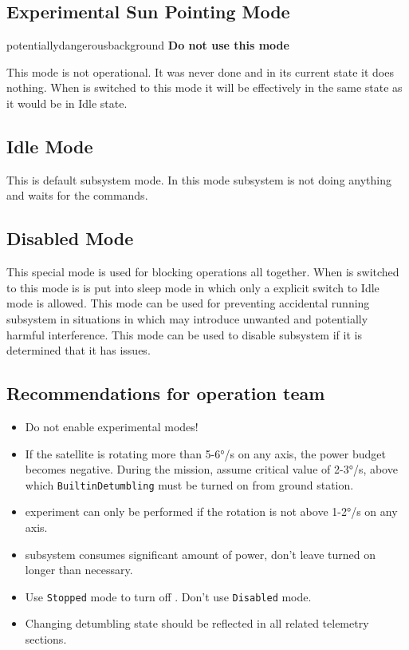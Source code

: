 \subsection{Experimental Sun Pointing Mode}

\begin{coloriconbox}{\faWarning}{potentiallydangerousbackground}
    \textbf{Do not use this mode}
\end{coloriconbox}

This mode is not operational. It was never done and in its current state it does nothing. 
When \Adcs is switched to this mode it will be effectively in the same state as it would 
be in Idle state.  

\subsection{Idle Mode}

This is default \Adcs subsystem mode. In this mode \Adcs subsystem is not 
doing anything and waits for the commands. 

\subsection{Disabled Mode}

This special mode is used for blocking \Adcs operations all together. When 
\Adcs is switched to this mode is is put into sleep mode in which only a
explicit switch to Idle mode is allowed. This mode can be used for preventing
accidental running \Adcs subsystem in situations in which \Adcs may introduce 
unwanted and potentially harmful interference. This mode can be used to disable 
\Adcs subsystem if it is determined that it has issues. 

\subsection{Recommendations for operation team}
\begin{itemize}
    \item Do not enable experimental modes!
    \item If the satellite is rotating more than 5-6°/s on any axis, the power budget becomes negative. 
    During the mission, assume critical value of 2-3°/s, above which \texttt{BuiltinDetumbling} must be 
    turned on from ground station.
    \item \sads experiment can only be performed if the rotation is not above 1-2°/s on any axis.    
    \item \Adcs subsystem consumes significant amount of power, don't leave turned on longer than necessary.
    \item Use \texttt{Stopped} mode to turn off \Adcs. Don't use \texttt{Disabled} mode.
    \item Changing detumbling state should be reflected in all \Imtq related telemetry sections.
\end{itemize}

